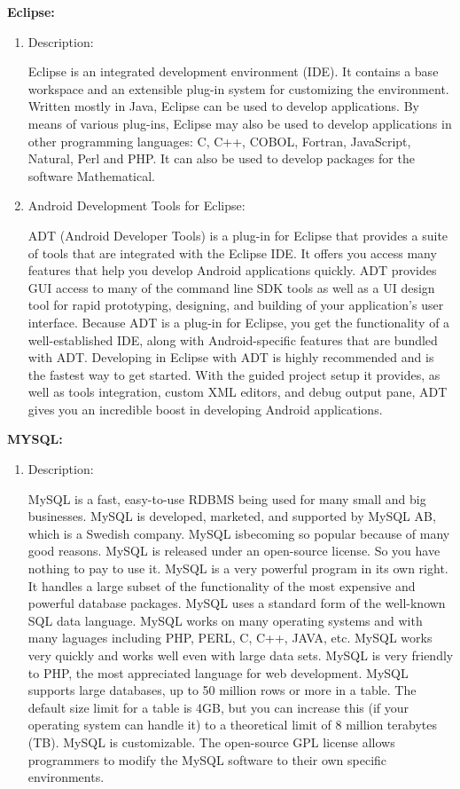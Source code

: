 {\bfseries Eclipse:}
\begin{enumerate}
\item Description:

Eclipse is an integrated development environment (IDE). It contains a base workspace and an extensible plug-in system for customizing the environment. Written mostly in Java, Eclipse can be used to develop applications. By means of various plug-ins, Eclipse may also be used to develop applications in other programming languages:  C, C++, COBOL, Fortran, JavaScript, Natural, Perl and PHP. It can also be used to develop packages for the software Mathematical. 

\item Android Development Tools for Eclipse:

ADT (Android Developer Tools) is a plug-in for Eclipse that provides a suite of tools that are integrated with the Eclipse IDE. It offers you access many features that help you develop Android applications quickly. ADT provides GUI access to many of the command line SDK tools as well as a UI design tool for rapid prototyping, designing, and building of your application's user interface. Because ADT is a plug-in for Eclipse, you get the functionality of a well-established IDE, along with Android-specific features that are bundled with ADT. Developing in Eclipse with ADT is highly recommended and is the fastest way to get started. With the guided project setup it provides, as well as tools integration, custom XML editors, and debug output pane, ADT gives you an incredible boost in developing Android applications.

\end{enumerate}

{\bfseries MYSQL:}
\begin{enumerate}
\item Description:

 MySQL is a fast, easy-to-use RDBMS being used for many small and big businesses. MySQL is developed, marketed, and supported by MySQL AB, which is a Swedish company. MySQL isbecoming so popular because of many good reasons. MySQL is released under an open-source license. So you have nothing to pay to use it. MySQL is a very powerful program in its own right. It handles a large subset of the functionality of the most expensive and powerful database packages. MySQL uses a standard form of the well-known SQL data language. MySQL works on many operating systems and with many laguages including PHP, PERL, C, C++, JAVA, etc. MySQL works very quickly and works well even with large data sets. MySQL is very friendly to PHP, the most appreciated language for web development. MySQL supports large databases, up to 50 million rows or more in a table. The default  size limit for a table is 4GB, but you can increase this (if your operating system can handle it) to a theoretical limit of 8 million terabytes (TB). MySQL is customizable. The open-source GPL license allows programmers to modify the MySQL software to  their own specific environments.
 

\end{enumerate}

